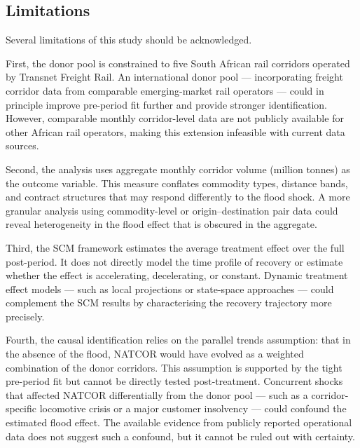 \subsection{Limitations}
\label{sec:disc_limit}

Several limitations of this study should be acknowledged.

First, the donor pool is constrained to five South African rail
corridors operated by Transnet Freight Rail.
An international donor pool --- incorporating freight corridor data
from comparable emerging-market rail operators --- could in
principle improve pre-period fit further and provide stronger
identification.
However, comparable monthly corridor-level data are not publicly
available for other African rail operators, making this extension
infeasible with current data sources.

Second, the analysis uses aggregate monthly corridor volume
(million tonnes) as the outcome variable.
This measure conflates commodity types, distance bands, and
contract structures that may respond differently to the flood shock.
A more granular analysis using commodity-level or origin--destination
pair data could reveal heterogeneity in the flood effect that is
obscured in the aggregate.

Third, the SCM framework estimates the average treatment effect
over the full post-period.
It does not directly model the time profile of recovery or estimate
whether the effect is accelerating, decelerating, or constant.
Dynamic treatment effect models --- such as local projections or
state-space approaches --- could complement the SCM results by
characterising the recovery trajectory more precisely.

Fourth, the causal identification relies on the parallel trends
assumption: that in the absence of the flood, NATCOR would have
evolved as a weighted combination of the donor corridors.
This assumption is supported by the tight pre-period fit but cannot
be directly tested post-treatment.
Concurrent shocks that affected NATCOR differentially from the
donor pool --- such as a corridor-specific locomotive crisis or
a major customer insolvency --- could confound the estimated flood
effect.
The available evidence from publicly reported operational data
does not suggest such a confound, but it cannot be ruled out
with certainty.

